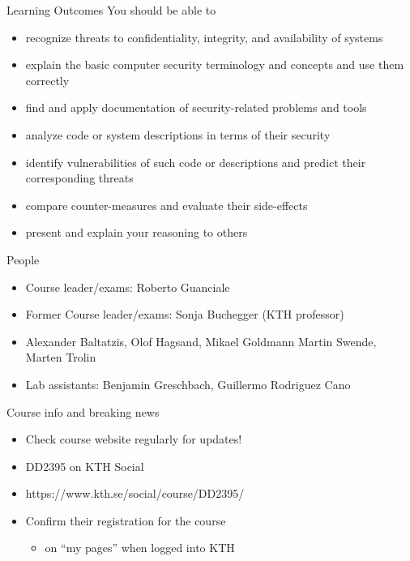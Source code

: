 \documentclass{beamer}
\begin{document}
\begin{frame}{Learning Outcomes}
  You should be able to
  \begin{itemize}
    \item recognize threats to confidentiality, integrity, and
      availability of systems
    \item explain the basic computer security terminology and concepts
      and use them correctly 
    \item find and apply documentation of security-related problems
      and tools 
    \item analyze code or system descriptions in terms
      of their security
    \item identify vulnerabilities of such code or descriptions and
      predict their corresponding threats
    \item compare counter-measures and evaluate their side-effects
    \item present and explain your reasoning to others
  \end{itemize}
\end{frame}

\begin{frame}{People}
  \begin{itemize}
    \item Course leader/exams: Roberto Guanciale
    \item Former Course leader/exams: Sonja Buchegger (KTH professor)
    \item Alexander Baltatzis,
      Olof Hagsand,
      Mikael Goldmann
      Martin Swende,
      Marten Trolin
    \item Lab assistants: 
      Benjamin Greschbach,
      Guillermo Rodriguez Cano
  \end{itemize}
\end{frame}

\begin{frame}{Course info and breaking news}
  \begin{itemize}
    \item Check course website regularly for updates!
    \item DD2395 on KTH Social
    \item https://www.kth.se/social/course/DD2395/
    \item \alert{Confirm their registration for the course}
      \begin{itemize}
        \item on ``my pages'' when logged into KTH
      \end{itemize}
  \end{itemize}
\end{frame}
\end{document}
